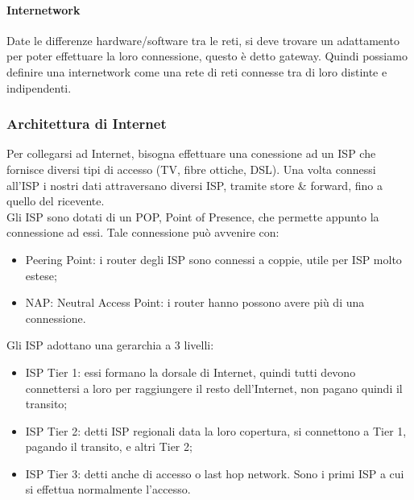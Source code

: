 \documentclass{subfiles}
\begin{document}
    \paragraph{Internetwork}
    Date le differenze hardware/software tra le reti, si deve trovare un adattamento per poter effettuare la loro connessione, questo è 
    detto gateway. Quindi possiamo definire una internetwork come una rete di reti connesse tra di loro distinte e indipendenti.


\subsubsection{Architettura di Internet}
    Per collegarsi ad Internet, bisogna effettuare una conessione ad un ISP che fornisce diversi tipi di accesso (TV, fibre ottiche, DSL). 
    Una volta connessi all'ISP i nostri dati attraversano diversi ISP, tramite store \& forward, fino a quello del ricevente.\\
    Gli ISP sono dotati di un POP, Point of Presence, che permette appunto la connessione ad essi. Tale connessione può avvenire con:
    \begin{itemize}
        \item Peering Point: i router degli ISP sono connessi a coppie, utile per ISP molto estese;
        \item NAP: Neutral Access Point: i router hanno possono avere più di una connessione.
    \end{itemize}
    Gli ISP adottano una gerarchia a 3 livelli:
    \begin{itemize}
        \item ISP Tier 1: essi formano la dorsale di Internet, quindi tutti devono connettersi a loro per raggiungere il resto 
        dell'Internet, non pagano quindi il transito;
        \item ISP Tier 2: detti ISP regionali data la loro copertura, si connettono a Tier 1, pagando il transito, e altri Tier 2;
        \item ISP Tier 3: detti anche di accesso o last hop network. Sono i primi ISP a cui si effettua normalmente l'accesso.
    \end{itemize}
\end{document}
